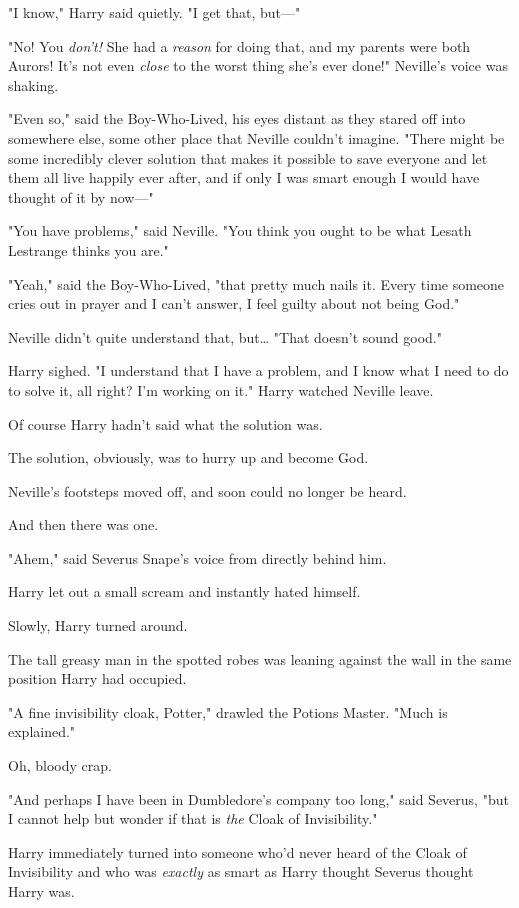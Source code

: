 "I know," Harry said quietly. "I get that, but---"

"No! You \emph{don't!} She had a \emph{reason} for doing that, and my parents
were both Aurors! It's not even \emph{close} to the worst thing she's ever
done!" Neville's voice was shaking.

"Even so," said the Boy-Who-Lived, his eyes distant as they stared off into
somewhere else, some other place that Neville couldn't imagine. "There might be
some incredibly clever solution that makes it possible to save everyone and let
them all live happily ever after, and if only I was smart enough I would have
thought of it by now---"

"You have problems," said Neville. "You think you ought to be what Lesath
Lestrange thinks you are."

"Yeah," said the Boy-Who-Lived, "that pretty much nails it. Every time someone
cries out in prayer and I can't answer, I feel guilty about not being God."

Neville didn't quite understand that, but{\ldots} "That doesn't sound good."

Harry sighed. "I understand that I have a problem, and I know what I need to do
to solve it, all right? I'm working on it."
\sbreak
Harry watched Neville leave.

Of course Harry hadn't said what the solution was.

The solution, obviously, was to hurry up and become God.

Neville's footsteps moved off, and soon could no longer be heard.

And then there was one.

"Ahem," said Severus Snape's voice from directly behind him.

Harry let out a small scream and instantly hated himself.

Slowly, Harry turned around.

The tall greasy man in the spotted robes was leaning against the wall in the
same position Harry had occupied.

"A fine invisibility cloak, Potter," drawled the Potions Master. "Much is
explained."

Oh, bloody crap.

"And perhaps I have been in Dumbledore's company too long," said Severus, "but
I cannot help but wonder if that is \emph{the} Cloak of Invisibility."

Harry immediately turned into someone who'd never heard of the Cloak of
Invisibility and who was \emph{exactly} as smart as Harry thought Severus
thought Harry was.

